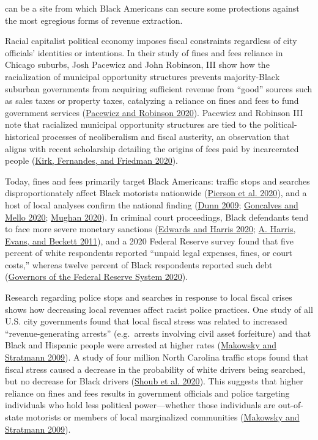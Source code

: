 \documentclass[
  12pt,
]{article}
\begin{document}
can be a site from which Black Americans can secure some protections against the most egregious forms of revenue extraction.

Racial capitalist political economy imposes fiscal constraints regardless of city officials' identities or intentions. In their study of fines and fees reliance in Chicago suburbs, Josh Pacewicz and John Robinson, III show how the racialization of municipal opportunity structures prevents majority-Black suburban governments from acquiring sufficient revenue from ``good'' sources such as sales taxes or property taxes, catalyzing a reliance on fines and fees to fund government services (\protect\hyperlink{ref-Pacewicz2020}{Pacewicz and Robinson 2020}). Pacewicz and Robinson III note that racialized municipal opportunity structures are tied to the political-historical processes of neoliberalism and fiscal austerity, an observation that aligns with recent scholarship detailing the origins of fees paid by incarcerated people (\protect\hyperlink{ref-Kirk2020}{Kirk, Fernandes, and Friedman 2020}).

Today, fines and fees primarily target Black Americans: traffic stops and searches disproportionately affect Black motorists nationwide (\protect\hyperlink{ref-Pierson2020}{Pierson et al. 2020}), and a host of local analyses confirm the national finding (\protect\hyperlink{ref-Dunn2009}{Dunn 2009}; \protect\hyperlink{ref-Goncalves2020}{Goncalves and Mello 2020}; \protect\hyperlink{ref-Mughan2020}{Mughan 2020}). In criminal court proceedings, Black defendants tend to face more severe monetary sanctions (\protect\hyperlink{ref-Edwards2020}{Edwards and Harris 2020}; \protect\hyperlink{ref-Harris2011}{A. Harris, Evans, and Beckett 2011}), and a 2020 Federal Reserve survey found that five percent of white respondents reported ``unpaid legal expenses, fines, or court costs,'' whereas twelve percent of Black respondents reported such debt (\protect\hyperlink{ref-BoardofGovernorsoftheFederalReserveSystem2020}{Governors of the Federal Reserve System 2020}).

Research regarding police stops and searches in response to local fiscal crises shows how decreasing local revenues affect racist police practices. One study of all U.S. city governments found that local fiscal stress was related to increased ``revenue-generating arrests'' (e.g.~arrests involving civil asset forfeiture) and that Black and Hispanic people were arrested at higher rates (\protect\hyperlink{ref-Makowsky2009}{Makowsky and Stratmann 2009}). A study of four million North Carolina traffic stops found that fiscal stress caused a decrease in the probability of white drivers being searched, but no decrease for Black drivers (\protect\hyperlink{ref-Shoub2020}{Shoub et al. 2020}). This suggests that higher reliance on fines and fees results in government officials and police targeting individuals who hold less political power---whether those individuals are out-of-state motorists or members of local marginalized communities (\protect\hyperlink{ref-Makowsky2009}{Makowsky and Stratmann 2009}).
\end{document}
